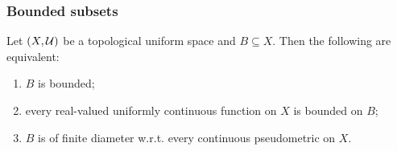 \subsubsection{Bounded subsets}

\begin{proposition} \label{metricBoundedness}
Let $\left( X, \mathcal{U} \right)$ be a topological uniform space and $B\subseteq X$. Then the following are equivalent:
\begin{enumerate}
\item $B$ is bounded;
\item every real-valued uniformly continuous function on $X$ is bounded on $B$;
\item $B$ is of finite diameter w.r.t. every continuous pseudometric on $X$.
\end{enumerate}
\end{proposition}

